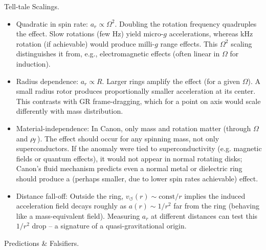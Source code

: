 \documentclass[11pt]{article}
\begin{document}
Tell-tale Scalings.


\begin{itemize}

\item 
Quadratic in spin rate: $a_{r} \propto \Omega^2$. Doubling the rotation frequency quadruples the effect. Slow rotations (few Hz) yield micro-$g$ accelerations, whereas kHz rotation (if achievable) would produce milli-$g$ range effects. This $\Omega^2$ scaling distinguishes it from, e.g., electromagnetic effects (often linear in $\Omega$ for induction).




\item 
Radius dependence: $a_{r} \propto R$. Larger rings amplify the effect (for a given $\Omega$). A small radius rotor produces proportionally smaller acceleration at its center. This contrasts with GR frame-dragging, which for a point on axis would scale differently with mass distribution.




\item 
Material-independence: In Canon, only mass and rotation matter (through $\Omega$ and $\rho_{\!f}$). The effect should occur for any spinning mass, not only superconductors. If the anomaly were tied to superconductivity (e.g. magnetic fields or quantum effects), it would not appear in normal rotating disks; Canon’s fluid mechanism predicts even a normal metal or dielectric ring should produce a (perhaps smaller, due to lower spin rates achievable) effect.




\item 
Distance fall-off: Outside the ring, $v_{\circlearrowleft}(r)\sim \text{const}/r$ implies the induced acceleration field decays roughly as $a(r)\sim 1/r^2$ far from the ring (behaving like a mass-equivalent field). Measuring $a_r$ at different distances can test this $1/r^2$ drop – a signature of a quasi-gravitational origin.




\end{itemize}

Predictions & Falsifiers.
\end{document}

